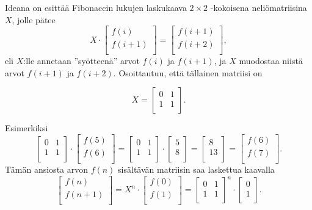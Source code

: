 \begin{samepage}
Ideana on esittää Fibonaccin lukujen laskukaava
$2 \times 2$ -kokoisena neliömatriisina
$X$, jolle pätee
\[ X \cdot
 \begin{bmatrix}
  f(i) \\
  f(i+1) \\
 \end{bmatrix}
=
 \begin{bmatrix}
  f(i+1) \\
  f(i+2) \\
 \end{bmatrix},
 \]
eli $X$:lle annetaan
''syötteenä'' arvot $f(i)$ ja $f(i+1)$,
ja $X$ muodostaa niistä
arvot $f(i+1)$ ja $f(i+2)$.
Osoittautuu, että tällainen matriisi on

\[ X = 
 \begin{bmatrix}
  0 & 1 \\
  1 & 1 \\
 \end{bmatrix}.
\]
\end{samepage}
\noindent
Esimerkiksi
\[
 \begin{bmatrix}
  0 & 1 \\
  1 & 1 \\
 \end{bmatrix}
\cdot
 \begin{bmatrix}
  f(5) \\
  f(6) \\
 \end{bmatrix}
=
 \begin{bmatrix}
  0 & 1 \\
  1 & 1 \\
 \end{bmatrix}
\cdot
 \begin{bmatrix}
  5 \\
  8 \\
 \end{bmatrix}
=
 \begin{bmatrix}
  8 \\
  13 \\
 \end{bmatrix}
=
 \begin{bmatrix}
  f(6) \\
  f(7) \\
 \end{bmatrix}.
\]
Tämän ansiosta arvon $f(n)$ sisältävän matriisin saa laskettua
kaavalla
\[
 \begin{bmatrix}
  f(n) \\
  f(n+1) \\
 \end{bmatrix}
=
X^n \cdot
 \begin{bmatrix}
  f(0) \\
  f(1) \\
 \end{bmatrix}
=
 \begin{bmatrix}
  0 & 1 \\
  1 & 1 \\
 \end{bmatrix}^n
\cdot
 \begin{bmatrix}
  0 \\
  1 \\
 \end{bmatrix}.
\]
